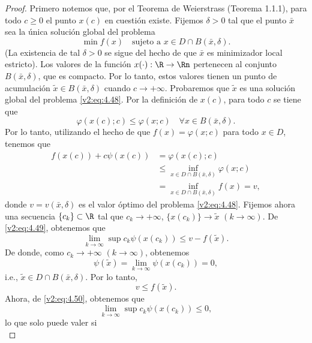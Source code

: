 \begin{proof}
    Primero notemos que, por el Teorema de Weierstrass (Teorema 1.1.1), para todo $c \ge 0$ el punto $x(c)$ en cuestión existe.
    Fijemos $\delta > 0$ tal que el punto $\bar{x}$ sea la única solución global del problema
    \begin{equation}
        \min f(x) \quad \text{sujeto a } x \in D \cap B(\bar{x}, \delta).
        \label{v2:eq:4.48}
    \end{equation}
    (La existencia de tal $\delta > 0$ se sigue del hecho de que $\bar{x}$ es minimizador local estricto).
    Los valores de la función $x(\cdot) : \R \to \Rn$ pertenecen al conjunto $B(\bar{x}, \delta)$, que es compacto. Por lo tanto, estos valores tienen un punto de acumulación $\tilde{x} \in B(\bar{x}, \delta)$ cuando $c \to +\infty$. Probaremos que $\tilde{x}$ es una solución global del problema \eqref{v2:eq:4.48}.
    Por la definición de $x(c)$, para todo $c$ se tiene que
    \[
        \varphi(x(c); c) \le \varphi(x; c) \quad \forall x \in B(\bar{x}, \delta).
    \]
    Por lo tanto, utilizando el hecho de que $f(x) = \varphi(x; c)$ para todo $x \in D$, tenemos que
    \begin{align}
        f(x(c)) + c\psi(x(c)) &= \varphi(x(c); c) \nonumber \\
        &\le \inf_{x \in D \cap B(\bar{x}, \delta)} \varphi(x; c) \nonumber \\
        &= \inf_{x \in D \cap B(\bar{x}, \delta)} f(x) = v, \label{v2:eq:4.49}
    \end{align}
    donde $v = v(\bar{x}, \delta)$ es el valor óptimo del problema \eqref{v2:eq:4.48}.
    Fijemos ahora una secuencia $\{c_k\} \subset \R$ tal que $c_k \to +\infty$, $\{x(c_k)\} \to \tilde{x}$ $(k \to \infty)$. De \eqref{v2:eq:4.49}, obtenemos que
    \begin{equation}
        \lim_{k \to \infty} \sup c_k \psi(x(c_k)) \le v - f(\tilde{x}).
        \label{v2:eq:4.50}
    \end{equation}
    De donde, como $c_k \to +\infty$ $(k \to \infty)$, obtenemos
    \[
        \psi(\tilde{x}) = \lim_{k \to \infty} \psi(x(c_k)) = 0,
    \]
    i.e., $\tilde{x} \in D \cap B(\bar{x}, \delta)$. Por lo tanto,
    \begin{equation}
        v \le f(\tilde{x}).
        \label{v2:eq:4.51}
    \end{equation}
    Ahora, de \eqref{v2:eq:4.50}, obtenemos que
    \[
        \lim_{k \to \infty} \sup c_k \psi(x(c_k)) \le 0,
    \]
    lo que solo puede valer si
    \[
\]
\end{proof}

